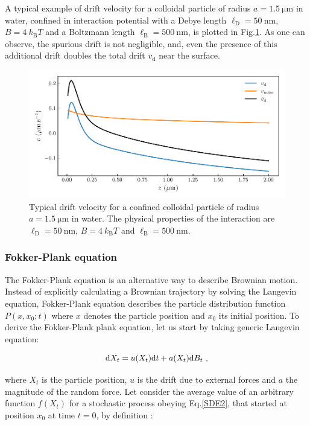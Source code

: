 A typical example of drift velocity for a colloidal particle of radius $a = 1.5 ~\mathrm{\mu m}$ in water, confined in interaction potential with a Debye length $\ell_\mathrm{D} = 50 ~ \mathrm{nm}$, $B = 4 ~k_\mathrm{B}T$ and a Boltzmann length $\ell_\mathrm{B} = 500 ~ \mathrm{nm}$, is plotted in Fig.\ref{fig.spurious}. As one can observe, the spurious drift is not negligible, and, even the presence of this additional drift doubles the total drift $\bar{v}_\mathrm{d}$ near the surface.
\begin{figure}[ht]
	\centering
	\includegraphics{02_body/chapter3/images/spurious_drift/spurious.pdf}
	\caption{Typical drift velocity for a confined colloidal particle of radius $a = 1.5 ~\mathrm{\mu m}$ in water. The physical properties of the interaction are $\ell_\mathrm{D} = 50 ~ \mathrm{nm}$, $B = 4 ~k_\mathrm{B}T$ and $\ell_\mathrm{B} = 500 ~ \mathrm{nm}$.} 
	\label{fig.spurious}
\end{figure}

\subsubsection{Fokker-Plank equation}

The Fokker-Plank equation is an alternative way to describe Brownian motion. Instead of explicitly calculating a Brownian trajectory by solving the Langevin equation, Fokker-Plank equation describes the particle distribution function $P(x, x_0; t)$ where $x$ denotes the particle position and $x_0$ its initial position. To derive the Fokker-Plank plank equation, let us start by taking generic Langevin equation:

\begin{equation}
	\textnormal{d}X_t = u(X_t) \textnormal{d}t + a(X_t)\textnormal{d}B_t ~,
	\label{SDE2}
\end{equation}

where $X_t$ is the particle position,  $u$ is the drift due to external forces and $a$ the magnitude of the random force. Let consider the average value of an arbitrary function $f(X_t)$ for a stochastic process obeying Eq.\ref{SDE2}, that started at position $x_0$ at time $t=0$, by definition \cite{le_bellac_equilibrium_2004}:

